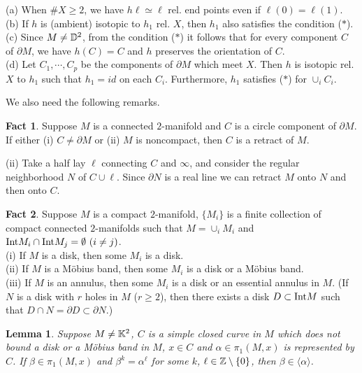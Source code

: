 \documentclass[11pt]{amsart}
\newtheorem{lemma}{Lemma}[section]
\theoremstyle{definition}
\newtheorem{fact}{Fact}[section]
\newtheorem*{Proof of Theorem 3.1}{Proof of Theorem 3.1}
\newtheorem*{Proof of Corollary 3.1}{Proof of Corollary 3.1}
\newtheorem*{Proof of Proposition 4.1.(1)}{Proof of Proposition 4.1.(1)}
\newtheorem*{Proof of Proposition 4.1.(2)}{Proof of Proposition 4.1.(2)}
\newtheorem*{Proof of Corollary 1.1}{Proof of Corollary 1.1}
\begin{document}
(a) When $\# X \geq 2$, we have $h \ell \simeq \ell$ rel. end points even if $\ell(0) = \ell(1)$. \\
(b) If $h$ is (ambient) isotopic to $h_1$ rel. $X$, then $h_1$ also satisfies the condition ($\ast$). \\
(c) Since $M \neq {\Bbb D}^2$, from the condition ($\ast$) it follows that for every component $C$ of $\partial M$, we have $h(C) = C$ and $h$ preserves the orientation of $C$. \\
(d) Let $C_1, \cdots, C_p$ be the components of $\partial M$ which meet $X$. Then $h$ is isotopic rel. $X$ to $h_1$ such that $h_1 = id$ on each $C_i$. Furthermore, $h_1$ satisfies ($\ast$) for $\cup_i C_i$. 

\vskip 3mm 

We also need the following remarks.

\begin{fact}
Suppose $M$ is a connected $2$-manifold and $C$ is a circle component of $\partial M$. If either {\rm (i)} $C \neq \partial M$ or {\rm (ii)} $M$ is noncompact, then $C$ is a retract of $M$. 
\end{fact}

(ii) Take a half lay $\ell$ connecting $C$ and $\infty$, and consider the regular neighborhood $N$ of $C \cup \ell$. Since $\partial N$ is a real line we can retract $M$ onto $N$ and then onto $C$. \\ 

\begin{fact}
Suppose $M$ is a compact $2$-manifold, $\{ M_i \}$ is a finite collection of compact connected $2$-manifolds such that $M = \cup_i M_i$ and ${\rm Int}M_i \cap {\rm Int}M_j = \emptyset \ (i \neq j)$. \\ {\rm (i)} If $M$ is a disk, then some $M_i$ is a disk. \\ {\rm (ii)} If $M$ is a M\"obius band, then some $M_i$ is a disk or a M\"obius band. \\
{\rm (iii)} If $M$ is an annulus, then some $M_i$ is a disk or an essential annulus in $M$. (If $N$ is a disk with $r$ holes in $M$ ($r \geq 2$), then there exists a disk $D \subset {\rm Int} M$ such that $D \cap N = \partial D \subset \partial N$.)
\end{fact}

\begin{lemma} Suppose $M \neq {\Bbb K}^2$, $C$ is a simple closed curve in $M$ which does not bound a disk or a M\"obius band in $M$, $x \in C$ and $\alpha \in \pi_1(M, x)$ is represented by $C$. If $\beta \in \pi_1(M, x)$ and $\beta^k = \alpha^\ell$ for some $k$, $\ell \in {\Bbb Z} \setminus \{0 \}$, then $\beta \in \langle \alpha \rangle$.
\end{lemma}
\end{document}
